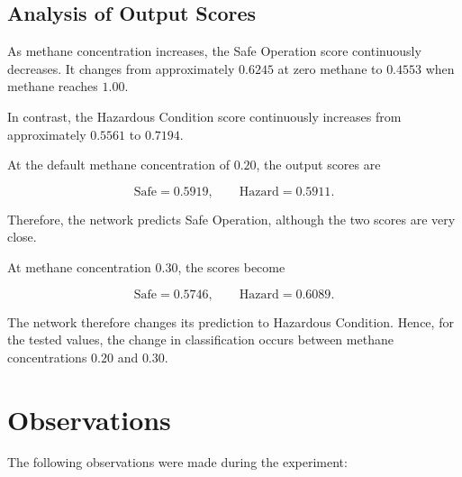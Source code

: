 \documentclass[12pt]{article}
\begin{document}
\subsection{Analysis of Output Scores}

As methane concentration increases, the Safe Operation score
continuously decreases. It changes from approximately $0.6245$ at
zero methane to $0.4553$ when methane reaches $1.00$.

In contrast, the Hazardous Condition score continuously increases from
approximately $0.5561$ to $0.7194$.

At the default methane concentration of $0.20$, the output scores are

\[
\text{Safe}=0.5919,
\qquad
\text{Hazard}=0.5911.
\]

Therefore, the network predicts Safe Operation, although the two scores
are very close.

At methane concentration $0.30$, the scores become

\[
\text{Safe}=0.5746,
\qquad
\text{Hazard}=0.6089.
\]

The network therefore changes its prediction to Hazardous Condition.
Hence, for the tested values, the change in classification occurs
between methane concentrations $0.20$ and $0.30$.


\section{Observations}

The following observations were made during the experiment:
\end{document}
